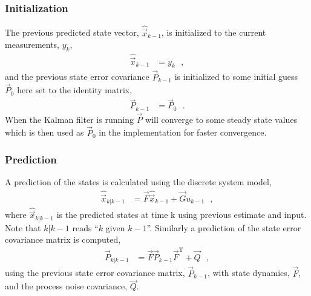 \subsubsection{Initialization}
The previous predicted state vector, $\hat{\vec{x}}_{k-1}$, is initialized to the current measurements, $y_k$,
%
\begin{align}
\hat{\vec{x}}_{k-1} &= y_k \ \ \ ,   \label{eq:xInit}
\end{align}
%
and the previous state error covariance $\vec{P}_{k-1}$ is initialized to some initial guess $\vec{P}_0$ here set to the identity matrix,
\begin{align}
\vec{P}_{k-1} &= \vec{P}_0  \ \ \ . \label{eq:initP}
\end{align}
%
When the Kalman filter is running $\vec{P}$ will converge to some steady state values which is then used as $\vec{P}_0$ in the implementation for faster convergence.

\subsubsection{Prediction}
A prediction of the states is calculated using the discrete system model,
\begin{align}
\hat{\vec{x}}_{k|k-1} &= \vec{F} \hat{\vec{x}}_{k-1} + \vec{G} u_{k-1} \ \ \ , \label{eq:predictedState}
\end{align}
where $\hat{\vec{x}}_{k|k-1}$ is the predicted states at time k using previous estimate and input. Note that $k|k-1$ reads ``$k$ given $k-1$''. Similarly a prediction of the state error covariance matrix is computed,
%
\begin{align}
\vec{P}_{k|k-1} &= \vec{F} \vec{P}_{k-1} \vec{F}^\mathrm{T} + \vec{Q}  \ \ \ , \label{eq:predictedStateErrorCovariance}
\end{align}
using the previous state error covariance matrix, $\vec{P}_{k-1}$, with state dynamics, $\vec{F}$, and the process noise covariance, $\vec{Q}$.
%
